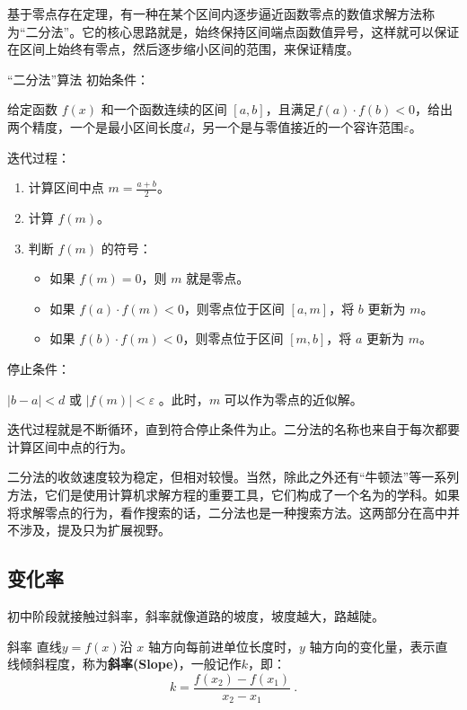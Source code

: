 基于零点存在定理，有一种在某个区间内逐步逼近函数零点的数值求解方法称为“二分法”。它的核心思路就是，始终保持区间端点函数值异号，这样就可以保证在区间上始终有零点，然后逐步缩小区间的范围，来保证精度。

\begin{theorem}{“二分法”算法}
初始条件：

给定函数 $f(x)$ 和一个函数连续的区间 $[a, b]$，且满足$f(a) \cdot f(b) < 0$，给出两个精度，一个是最小区间长度$d$，另一个是与零值接近的一个容许范围$\varepsilon$。

迭代过程：

\begin{enumerate}
\item 计算区间中点 $m = \frac{a + b}{2}$。
\item 计算 $f(m)$。
\item 判断 $f(m)$ 的符号：
\begin{itemize}
\item 如果 $f(m) = 0$，则 $m$ 就是零点。
\item 如果 $f(a) \cdot f(m) < 0$，则零点位于区间 $[a, m]$，将 $b$ 更新为 $m$。
\item 如果 $f(b) \cdot f(m) < 0$，则零点位于区间 $[m, b]$，将 $a$ 更新为 $m$。
\end{itemize}
\end{enumerate}

停止条件：

$|b - a|<d$ 或 $|f(m)|<\varepsilon$ 。此时，$m$ 可以作为零点的近似解。
\end{theorem}

迭代过程就是不断循环，直到符合停止条件为止。二分法的名称也来自于每次都要计算区间中点的行为。

二分法的收敛速度较为稳定，但相对较慢。当然，除此之外还有“牛顿法”等一系列方法，它们是使用计算机求解方程的重要工具，它们构成了一个名为的学科。如果将求解零点的行为，看作搜索的话，二分法也是一种搜索方法。这两部分在高中并不涉及，提及只为扩展视野。

\subsection{变化率}

初中阶段就接触过斜率，斜率就像道路的坡度，坡度越大，路越陡。

\begin{definition}{斜率}
直线$y=f(x)$沿 $x$ 轴方向每前进单位长度时，$y$ 轴方向的变化量，表示直线倾斜程度，称为\textbf{斜率(Slope)}，一般记作$k$，即：
\begin{equation}
k = \frac{f(x_2)-f(x_1)}{x_2-x_1}~.
\end{equation}
\end{definition}

